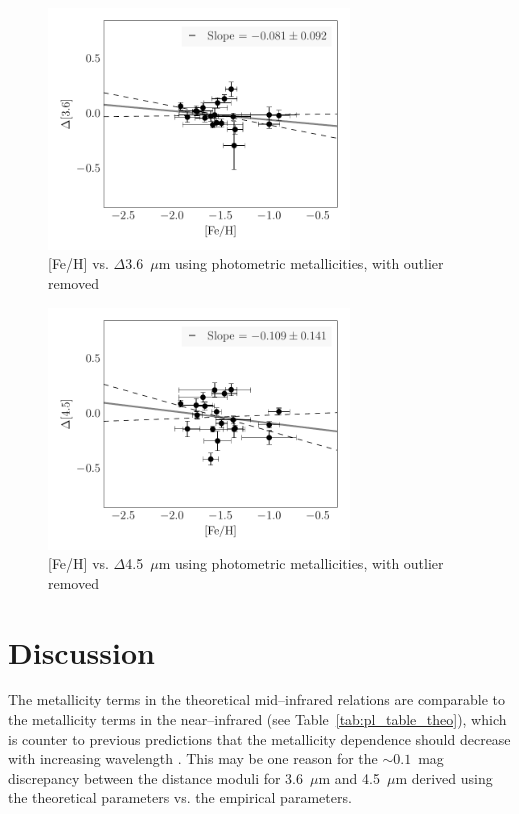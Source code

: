 \documentclass[a4paper,fleqn,usenatbib]{mnras}
\begin{document}
\begin{figure}
\begin{center}
\includegraphics[width=80mm]{final_plots/delta_feh_3p6_phot_no_outlier.pdf}
\caption{[Fe/H] vs. $\Delta$3.6~$\mu$m using photometric metallicities, with outlier removed}
\label{fig:delta_3p6_phot_nooutlier}
\end{center}
\end{figure}

\begin{figure}
\begin{center}
\includegraphics[width=80mm]{final_plots/delta_feh_4p5_phot_no_outlier.pdf}
\caption{[Fe/H] vs. $\Delta$4.5~$\mu$m using photometric metallicities, with outlier removed}
\label{fig:delta_4p5_phot_nooutlier}
\end{center}
\end{figure}


\section{Discussion}
\label{sec:discussion}


The metallicity terms in the theoretical mid--infrared relations are comparable to the metallicity terms in the near--infrared (see Table~\ref{tab:pl_table_theo}), which is counter to previous predictions that the metallicity dependence should decrease with increasing wavelength \citep{2004ApJS..154..633C, 2001MNRAS.326.1183B}. This may be one reason for the $\sim\!\!0.1$~mag discrepancy between the distance moduli for 3.6~$\mu$m and 4.5~$\mu$m derived using the theoretical parameters vs. the empirical parameters.
\end{document}
